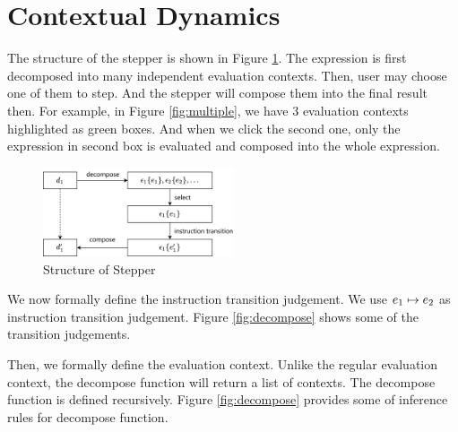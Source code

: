 \section{Contextual Dynamics}
\label{sec:condy}


The structure of the stepper is shown in Figure \ref{fig:structure}. The expression is first decomposed into many independent evaluation contexts. Then, user may choose one of them to step. And the stepper will compose them into the final result then. For example, in Figure \ref{fig:multiple}, we have 3 evaluation contexts highlighted as green boxes. And when we click the second one, only the expression in second box is evaluated and composed into the whole expression.

\begin{figure}[htbp]
  \centering
  \includegraphics[width=0.5\textwidth]{img/struct.png}
  \caption{Structure of Stepper}
  \label{fig:structure}
\end{figure}

We now formally define the instruction transition judgement. We use $e_1 \mapsto e_2$ as instruction transition judgement. Figure \ref{fig:decompose} shows some of the transition judgements.


Then, we formally define the evaluation context. Unlike the regular evaluation context, the decompose function will return a list of contexts. The decompose function is defined recursively. Figure \ref{fig:decompose} provides some of inference rules for decompose function.

